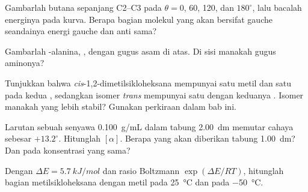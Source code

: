 \begin{exercise}[$\star\star$]\label{exo:b1:stereochemistry-in-depth:5}
Gambarlah  butana sepanjang C2--C3 pada $\theta = 0$, 60,
120, dan $180^\circ$, lalu bacalah energinya pada kurva. Berapa bagian
molekul yang akan bersifat gauche seandainya energi gauche dan anti sama?
\end{exercise}

\begin{exercise}[$\star\star$]\label{exo:b1:stereochemistry-in-depth:6}
Gambarlah  -alanina,
, dengan gugus asam di atas. Di sisi manakah gugus
aminonya?
\end{exercise}

\begin{exercise}[$\star\star$]\label{exo:b1:stereochemistry-in-depth:7}
Tunjukkan bahwa \textit{cis}-1,2-dimetilsikloheksana mempunyai satu metil
 dan satu  pada kedua , sedangkan isomer
\textit{trans} mempunyai satu  dengan keduanya . Isomer
manakah yang lebih stabil? Gunakan perkiraan dalam bab ini.
\end{exercise}

\begin{exercise}[$\star\star$]\label{exo:b1:stereochemistry-in-depth:8}
Larutan sebuah senyawa  \qty{0.100}{g/mL} dalam tabung
\qty{2.00}{dm} memutar cahaya sebesar $+13.2^\circ$. Hitunglah $[\alpha]$.
Berapa yang akan diberikan tabung \qty{1.00}{dm}? Dan  pada
konsentrasi yang sama?
\end{exercise}

\begin{exercise}[$\star\star$]\label{exo:b1:stereochemistry-in-depth:9}
Dengan $\Delta E = \qty{5.7}{kJ/mol}$ dan rasio Boltzmann
$\exp(\Delta E/RT)$, hitunglah bagian  metilsikloheksana dengan
metil  pada \qty{25}{\celsius} dan pada \qty{-50}{\celsius}.
\end{exercise}

